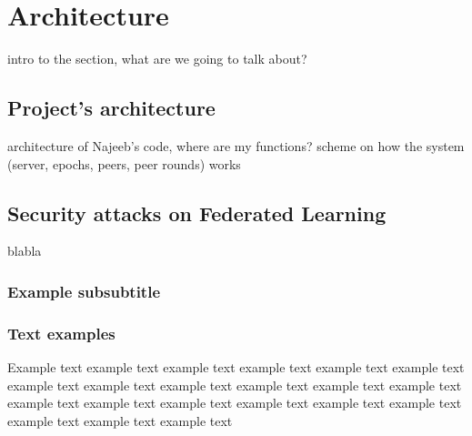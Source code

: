 \section{Architecture}
intro to the section, what are we going to talk about?
\subsection{Project's architecture}
architecture of Najeeb's code, where are my functions?
scheme on how the system (server, epochs, peers, peer rounds) works

\subsection{Security attacks on Federated Learning}
blabla

\subsubsection{Example subsubtitle}


\subsubsection{Text examples}
Example text example text example text example text example text example text example text
example text example text example text example text example text example text example text
example text example text example text example text example text example text example text


\pagebreak